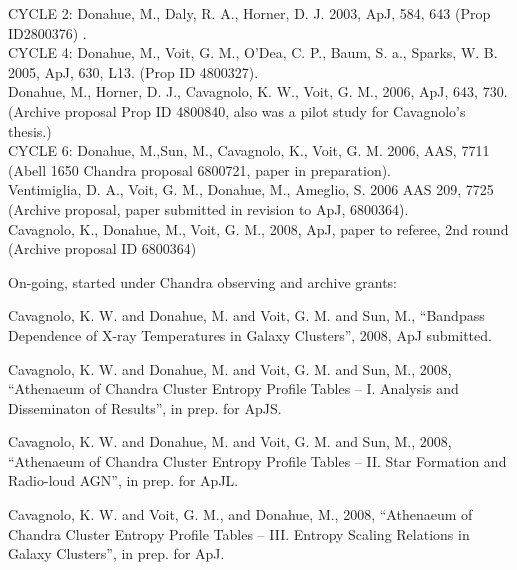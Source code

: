 \documentclass[letterpaper,11pt]{article}
\begin{document}
CYCLE 2:
Donahue, M., Daly, R. A., Horner, D. J. 2003, ApJ, 584, 643 (Prop ID2800376) .\\

CYCLE 4:
Donahue, M., Voit, G. M., O'Dea, C. P., Baum, S. a., Sparks, W. B. 2005, ApJ, 630, L13. (Prop ID 4800327).\\
Donahue, M., Horner, D. J., Cavagnolo, K. W., Voit, G. M., 2006, ApJ, 643, 730. (Archive proposal Prop ID 4800840, 
also was a pilot study for Cavagnolo's thesis.)\\

CYCLE 6:
Donahue, M.,Sun, M., Cavagnolo, K., Voit, G. M. 2006, AAS, 7711 (Abell 1650 Chandra proposal 6800721, paper in preparation).\\
Ventimiglia, D. A., Voit, G. M., Donahue, M., Ameglio, S. 2006 AAS 209, 7725 (Archive proposal, paper submitted in
revision to ApJ, 6800364).\\
Cavagnolo, K., Donahue, M., Voit, G. M., 2008, ApJ, paper to referee, 2nd round (Archive proposal ID 6800364)

On-going, started under Chandra observing and archive grants:

Cavagnolo, K. W. and Donahue, M. and Voit, G. M. and Sun, M.,
  ``Bandpass Dependence of X-ray Temperatures in Galaxy Clusters'',
  2008, ApJ submitted.

Cavagnolo, K. W. and Donahue, M. and Voit, G. M. and Sun, M., 2008,
  ``Athenaeum of Chandra Cluster Entropy Profile Tables -- I.
  Analysis and Disseminaton of Results'', in prep. for ApJS.

Cavagnolo, K. W. and Donahue, M. and Voit, G. M. and Sun, M., 2008, 
  ``Athenaeum of Chandra Cluster Entropy Profile Tables -- II.
  Star Formation and Radio-loud AGN'', in prep. for ApJL.

Cavagnolo, K. W. and Voit, G. M., and Donahue, M., 2008,
  ``Athenaeum of Chandra Cluster Entropy Profile Tables -- III.
  Entropy Scaling Relations in Galaxy Clusters'', in prep. for ApJ.
 
 

\enddocument
\end{document}
